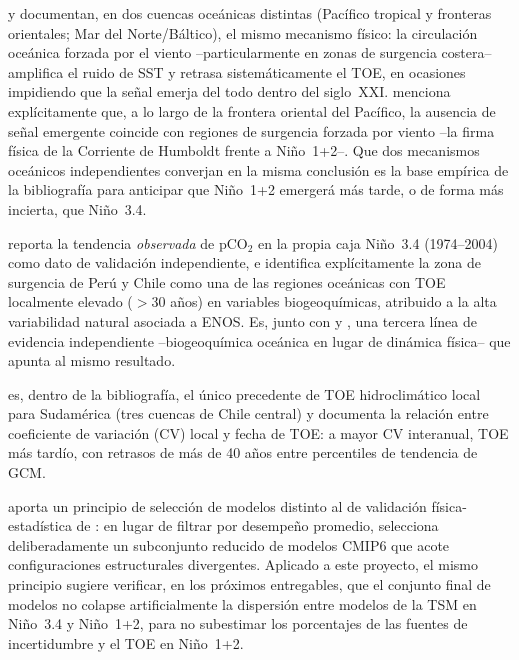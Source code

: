 \documentclass[11pt,a4paper]{article}
\begin{document}
\citet{larson2025} y \citet{poul2025} documentan, en dos cuencas oceánicas distintas (Pacífico tropical y fronteras orientales; Mar del Norte/Báltico), el mismo mecanismo físico: la circulación oceánica forzada por el viento --particularmente en zonas de surgencia costera-- amplifica el ruido de SST y retrasa sistemáticamente el TOE, en ocasiones impidiendo que la señal emerja del todo dentro del siglo~XXI. \citet{larson2025} menciona explícitamente que, a lo largo de la frontera oriental del Pacífico, la ausencia de señal emergente coincide con regiones de surgencia forzada por viento --la firma física de la Corriente de Humboldt frente a Ni\~no~1+2--. Que dos mecanismos oceánicos independientes converjan en la misma conclusión es la base empírica de la bibliografía para anticipar que Ni\~no~1+2 emergerá más tarde, o de forma más incierta, que Ni\~no~3.4.

\citet{keller2014} reporta la tendencia \emph{observada} de pCO$_2$ en la propia caja Ni\~no~3.4 (1974--2004) como dato de validación independiente, e identifica explícitamente la zona de surgencia de Perú y Chile como una de las regiones oceánicas con TOE localmente elevado ($>$30 años) en variables biogeoquímicas, atribuido a la alta variabilidad natural asociada a ENOS. Es, junto con \citet{larson2025} y \citet{poul2025}, una tercera línea de evidencia independiente --biogeoquímica oceánica en lugar de dinámica física-- que apunta al mismo resultado.

\citet{chadwick2019} es, dentro de la bibliografía, el único precedente de TOE hidroclimático local para Sudamérica (tres cuencas de Chile central) y documenta la relación entre coeficiente de variación (CV) local y fecha de TOE: a mayor CV interanual, TOE más tardío, con retrasos de más de 40 años entre percentiles de tendencia de GCM. 

\citet{lois2026} aporta un principio de selección de modelos distinto al de validación física-estadística de \citet{bruno2023}: en lugar de filtrar por desempeño promedio, selecciona deliberadamente un subconjunto reducido de modelos CMIP6 que acote configuraciones estructurales divergentes. Aplicado a este proyecto, el mismo principio sugiere verificar, en los próximos entregables, que el conjunto final de modelos no colapse artificialmente la dispersión entre modelos de la TSM en Ni\~no~3.4 y Ni\~no~1+2, para no subestimar los porcentajes de las fuentes de incertidumbre y el TOE en Ni\~no~1+2.
\end{document}

